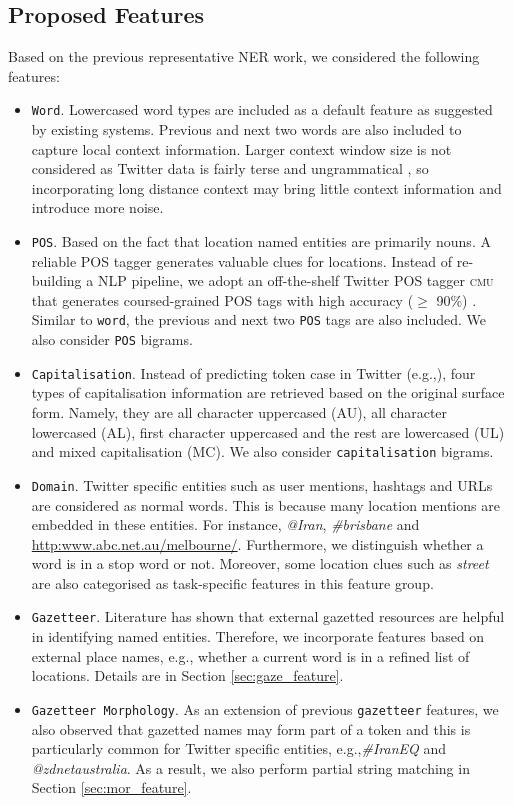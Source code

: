 \documentclass[11pt]{article}
\newcommand{\eg}{e.g.,\xspace}
\newcommand{\myex}[1]{\textit{#1}}
\newcommand{\cmu}{\textsc{cmu}\xspace}
\newcommand{\feature}[1]{\texttt{#1}\xspace}
\newcommand{\myurl}[1]{{\footnotesize\url{#1}}}
\newcommand{\secref}[2][]{Section#1 \ref{#2}}
\begin{document}
\subsection{Proposed Features}
\label{sec:basic_feature}

Based on the previous representative NER work, we considered the following features:

\begin{itemize}
    \item \feature{Word}. Lowercased word types are included as a default feature as suggested by existing systems. Previous and next two words are also included to capture local context information. Larger context window size is not considered as Twitter data is fairly terse and ungrammatical \cite{baldwin2013}, so incorporating long distance context may bring little context information and introduce more noise.
    \item \feature{POS}. Based on the fact that location named entities are primarily nouns. A reliable POS tagger generates valuable clues for locations. Instead of re-building a NLP pipeline, we adopt an off-the-shelf Twitter POS tagger \cmu that generates coursed-grained POS tags with high accuracy ($\ge$ 90\%) \cite{naacl13owop}. Similar to \feature{word}, the previous and next two \feature{POS} tags are also included. We also consider \feature{POS} bigrams.
    \item \feature{Capitalisation}. Instead of predicting token case in Twitter (\eg \cite{emnlp11ritt}), four types of capitalisation information are retrieved based on the original surface form. Namely, they are all character uppercased (AU), all character lowercased (AL), first character uppercased and the rest are lowercased (UL) and mixed capitalisation (MC). We also consider \feature{capitalisation} bigrams.
    \item \feature{Domain}. Twitter specific entities such as user mentions, hashtags and URLs are considered as normal words. This is because many location mentions are embedded in these entities. For instance, \myex{@Iran}, \myex{\#brisbane} and \myurl{http:www.abc.net.au/melbourne/}. Furthermore, we distinguish whether a word is in a stop word or not. Moreover, some location clues such as \myex{street} are also categorised as task-specific features in this feature group.
    \item \feature{Gazetteer}. Literature has shown that external gazetted resources are helpful in identifying named entities. Therefore, we incorporate features based on external place names, \eg whether a current word is in a refined list of locations. Details are in \secref{sec:gaze_feature}.
    \item \feature{Gazetteer Morphology}. As an extension of previous \feature{gazetteer} features, we also observed that gazetted names may form part of a token and this is particularly common for Twitter specific entities, \eg \myex{\#IranEQ} and \myex{@zdnetaustralia}. As a result, we also perform partial string matching in \secref{sec:mor_feature}. 
\end{itemize}
\end{document}
